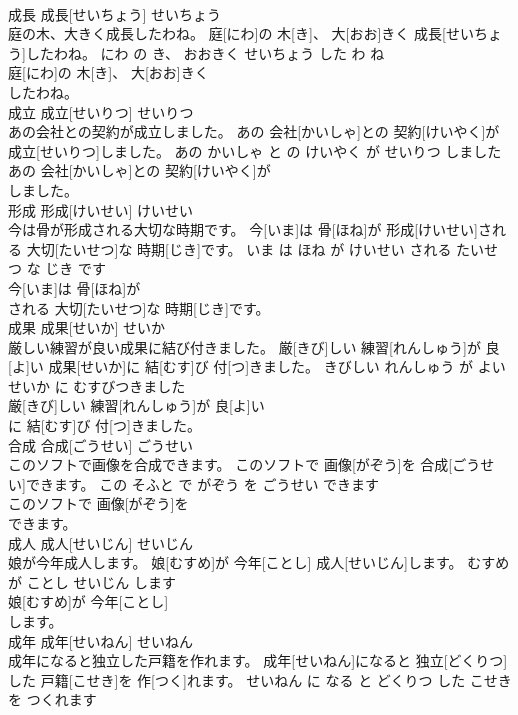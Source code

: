 \documentclass[8pt]{extreport}
\begin{document}
\begin{CJK}{UTF8}{min}
\\	成長	成長[せいちょう]	せいちょう	
\\	庭の木、大きく成長したわね。	庭[にわ]の 木[き]、 大[おお]きく 成長[せいちょう]したわね。	にわ の き、 おおきく せいちょう した わ ね	
\\	庭[にわ]の 木[き]、 大[おお]きく
\\	したわね。			
\\	成立	成立[せいりつ]	せいりつ	
\\	あの会社との契約が成立しました。	あの 会社[かいしゃ]との 契約[けいやく]が 成立[せいりつ]しました。	あの かいしゃ と の けいやく が せいりつ しました	
\\	あの 会社[かいしゃ]との 契約[けいやく]が
\\	しました。			
\\	形成	形成[けいせい]	けいせい	
\\	今は骨が形成される大切な時期です。	今[いま]は 骨[ほね]が 形成[けいせい]される 大切[たいせつ]な 時期[じき]です。	いま は ほね が けいせい される たいせつ な じき です	
\\	今[いま]は 骨[ほね]が
\\	される 大切[たいせつ]な 時期[じき]です。			
\\	成果	成果[せいか]	せいか	
\\	厳しい練習が良い成果に結び付きました。	厳[きび]しい 練習[れんしゅう]が 良[よ]い 成果[せいか]に 結[むす]び 付[つ]きました。	きびしい れんしゅう が よい せいか に むすびつきました	
\\	厳[きび]しい 練習[れんしゅう]が 良[よ]い
\\	に 結[むす]び 付[つ]きました。			
\\	合成	合成[ごうせい]	ごうせい	
\\	このソフトで画像を合成できます。	このソフトで 画像[がぞう]を 合成[ごうせい]できます。	この そふと で がぞう を ごうせい できます	
\\	このソフトで 画像[がぞう]を
\\	できます。			
\\	成人	成人[せいじん]	せいじん	
\\	娘が今年成人します。	娘[むすめ]が 今年[ことし] 成人[せいじん]します。	むすめ が ことし せいじん します	
\\	娘[むすめ]が 今年[ことし]
\\	します。			
\\	成年	成年[せいねん]	せいねん	
\\	成年になると独立した戸籍を作れます。	成年[せいねん]になると 独立[どくりつ]した 戸籍[こせき]を 作[つく]れます。	せいねん に なる と どくりつ した こせき を つくれます	

\end{CJK}
\end{document}
